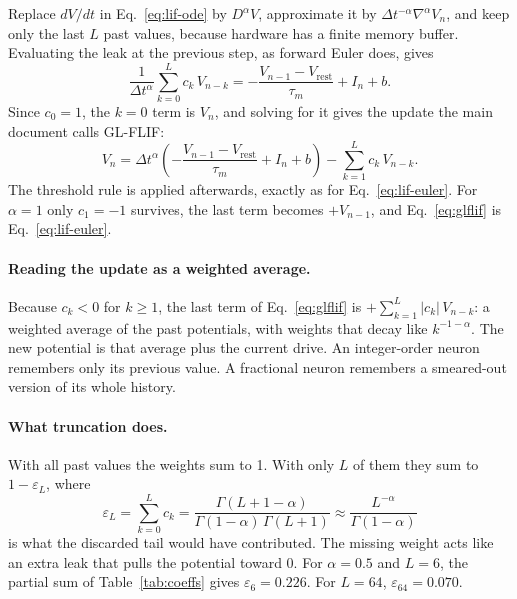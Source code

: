 \documentclass[11pt,a4paper]{article}
\newcommand{\Vrest}{V_{\mathrm{rest}}}
\begin{document}
Replace $dV/dt$ in Eq.~\eqref{eq:lif-ode} by $D^{\alpha} V$, approximate it by $\Delta t^{-\alpha}\nabla^{\alpha} V_n$, and keep only the last $L$ past values, because hardware has a finite memory buffer. Evaluating the leak at the previous step, as forward Euler does, gives
\begin{equation*}
\frac{1}{\Delta t^{\alpha}} \sum_{k=0}^{L} c_k\, V_{n-k} = -\frac{V_{n-1} - \Vrest}{\tau_m} + I_n + b.
\end{equation*}
Since $c_0 = 1$, the $k = 0$ term is $V_n$, and solving for it gives the update the main document calls GL-FLIF:
\begin{equation}
V_n = \Delta t^{\alpha}\left( -\frac{V_{n-1} - \Vrest}{\tau_m} + I_n + b \right) - \sum_{k=1}^{L} c_k\, V_{n-k}.
\label{eq:glflif}
\end{equation}
The threshold rule is applied afterwards, exactly as for Eq.~\eqref{eq:lif-euler}. For $\alpha = 1$ only $c_1 = -1$ survives, the last term becomes $+V_{n-1}$, and Eq.~\eqref{eq:glflif} is Eq.~\eqref{eq:lif-euler}.

\paragraph{Reading the update as a weighted average.} Because $c_k < 0$ for $k \ge 1$, the last term of Eq.~\eqref{eq:glflif} is $+\sum_{k=1}^{L} |c_k|\, V_{n-k}$: a weighted average of the past potentials, with weights that decay like $k^{-1-\alpha}$. The new potential is that average plus the current drive. An integer-order neuron remembers only its previous value. A fractional neuron remembers a smeared-out version of its whole history.

\paragraph{What truncation does.} With all past values the weights sum to 1. With only $L$ of them they sum to $1 - \varepsilon_L$, where
\begin{equation}
\varepsilon_L = \sum_{k=0}^{L} c_k = \frac{\Gamma(L + 1 - \alpha)}{\Gamma(1-\alpha)\,\Gamma(L+1)} \approx \frac{L^{-\alpha}}{\Gamma(1-\alpha)}
\label{eq:epsL}
\end{equation}
is what the discarded tail would have contributed. The missing weight acts like an extra leak that pulls the potential toward 0. For $\alpha = 0.5$ and $L = 6$, the partial sum of Table~\ref{tab:coeffs} gives $\varepsilon_6 = 0.226$. For $L = 64$, $\varepsilon_{64} = 0.070$.
\end{document}
